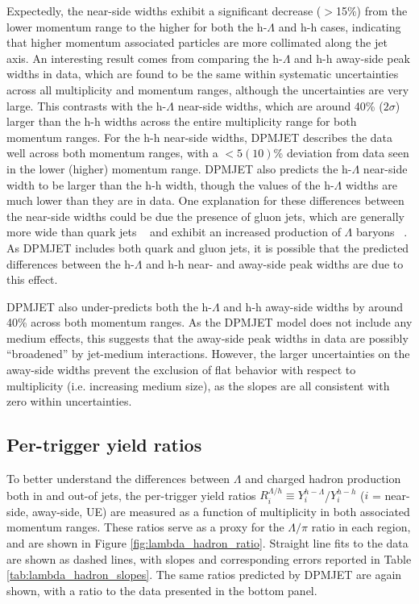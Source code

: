 Expectedly, the near-side widths exhibit a significant decrease ($>$15\%) from the lower momentum range to the higher for both the h-$\Lambda$ and h-h cases, indicating that higher momentum associated particles are more collimated along the jet axis. An interesting result comes from comparing the h-$\Lambda$ and h-h away-side peak widths in data, which are found to be the same within systematic uncertainties across all multiplicity and momentum ranges, although the uncertainties are very large. This contrasts with the h-$\Lambda$ near-side widths, which are around 40\% ($2\sigma$) larger than the h-h widths across the entire multiplicity range for both momentum ranges. For the h-h near-side widths, DPMJET describes the data well across both momentum ranges, with a $<5 (10)$\%  deviation from data seen in the lower (higher) momentum range. DPMJET also predicts the h-$\Lambda$ near-side width to be larger than the h-h width, though the values of the h-$\Lambda$ widths are much lower than they are in data. One explanation for these differences between the near-side widths could be due the presence of gluon jets, which are generally more wide than quark jets ~\cite{GluonJet1} and exhibit an increased production of $\Lambda$ baryons ~\cite{GluonJet2}. As DPMJET includes both quark and gluon jets, it is possible that the predicted differences between the h-$\Lambda$ and h-h near- and away-side peak widths are due to this effect. 

DPMJET also under-predicts both the h-$\Lambda$ and h-h away-side widths by around 40\% across both momentum ranges. As the DPMJET model does not include any medium effects, this suggests that the away-side peak widths in data are possibly ``broadened'' by jet-medium interactions. However, the larger uncertainties on the away-side widths prevent the exclusion of flat behavior with respect to multiplicity (i.e. increasing medium size), as the slopes are all consistent with zero within uncertainties.





\subsection{Per-trigger yield ratios}

To better understand the differences between $\Lambda$ and charged hadron production both in and out-of jets, the per-trigger yield ratios $R_{i}^{\Lambda/h} \equiv Y_{i}^{h-\Lambda}$/$Y_{i}^{h-h}$ ($i$ = near-side, away-side, UE) are measured as a function of multiplicity in both associated momentum ranges. These ratios serve as a proxy for the $\Lambda/\pi$ ratio in each region, and are shown in Figure \ref{fig:lambda_hadron_ratio}. Straight line fits to the data are shown as dashed lines, with slopes and corresponding errors reported in Table \ref{tab:lambda_hadron_slopes}. The same ratios predicted by DPMJET are again shown, with a ratio to the data presented in the bottom panel. 

